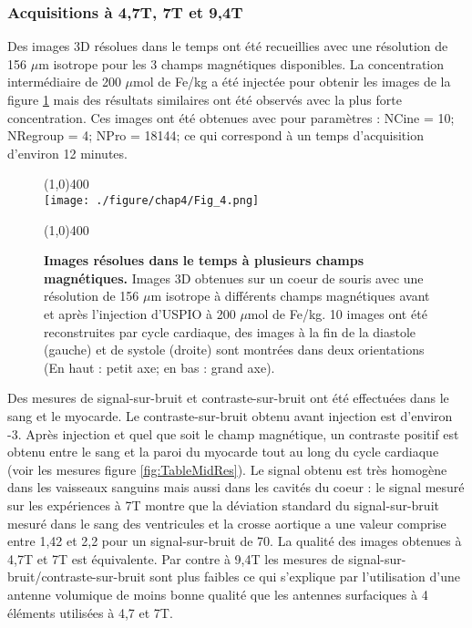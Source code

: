 \subsubsection{Acquisitions à 4,7T, 7T et 9,4T}

Des images 3D résolues dans le temps ont été recueillies avec une résolution de 156 $\mu$m isotrope pour les 3 champs magnétiques disponibles. La concentration intermédiaire de 200 $\mu$mol de Fe/kg a été injectée pour obtenir les images de la figure \ref{fig:UTEUSPIOField} mais des résultats similaires ont été observés avec la plus forte concentration. Ces images ont été obtenues avec pour paramètres : NCine = 10; NRegroup = 4; NPro = 18144; ce qui correspond à un temps d'acquisition d'environ 12 minutes.

\begin{figure}[H]
\centering
\line(1,0){400} \\
\texttt{[image: ./figure/chap4/Fig\_4.png]}
\caption[Images résolues dans le temps à plusieurs champs magnétiques.]{\label{fig:UTEUSPIOField} \textbf{Images résolues dans le temps à plusieurs champs magnétiques.} Images 3D obtenues sur un coeur de souris avec une résolution de 156 $\mu$m isotrope à différents champs magnétiques avant et après l'injection d'USPIO à 200 $\mu$mol de Fe/kg. 10 images ont été reconstruites par cycle cardiaque, des images à la fin de la diastole (gauche) et de systole (droite) sont montrées dans deux orientations (En haut : petit axe; en bas : grand axe).}
\line(1,0){400} \\ 
\end{figure}

Des mesures de signal-sur-bruit et contraste-sur-bruit ont été effectuées dans le sang et le myocarde. Le contraste-sur-bruit obtenu avant injection est d'environ -3. Après injection et quel que soit le champ magnétique, un contraste positif est obtenu entre le sang et la paroi du myocarde tout au long du cycle cardiaque (voir les mesures figure \ref{fig:TableMidRes}). Le signal obtenu est très homogène dans les vaisseaux sanguins mais aussi dans les cavités du coeur : le signal mesuré sur les expériences à 7T montre que la déviation standard du signal-sur-bruit mesuré dans le sang des ventricules et la crosse aortique a une valeur comprise entre 1,42 et 2,2 pour un signal-sur-bruit de 70. La qualité des images obtenues à 4,7T et 7T est équivalente. Par contre à 9,4T les mesures de signal-sur-bruit/contraste-sur-bruit sont plus faibles ce qui s'explique par l'utilisation d'une antenne volumique de moins bonne qualité que les antennes surfaciques à 4 éléments utilisées à 4,7 et 7T.

